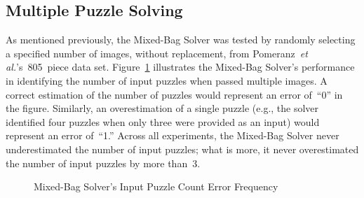 \subsection{Multiple Puzzle Solving}

As mentioned previously, the Mixed-Bag Solver was tested by randomly selecting a specified number of images, without replacement, from Pomeranz~\textit{et al.}'s~805~piece data set.  Figure~\ref{fig:inputPuzzleCountErrorFrequency} illustrates the Mixed-Bag Solver's performance in identifying the number of input puzzles when passed multiple images.  A correct estimation of the number of puzzles would represent an error of~``0'' in the figure.  Similarly, an overestimation of a single puzzle (e.g., the solver identified four puzzles when only three were provided as an input) would represent an error of~``1.''  Across all experiments, the Mixed-Bag Solver never underestimated the number of input puzzles; what is more, it never overestimated the number of input puzzles by more than~3.  

\begin{figure}
\begin{center}
\end{center}
\caption{Mixed-Bag Solver's Input Puzzle Count Error Frequency}
\label{fig:inputPuzzleCountErrorFrequency}
\end{figure}

